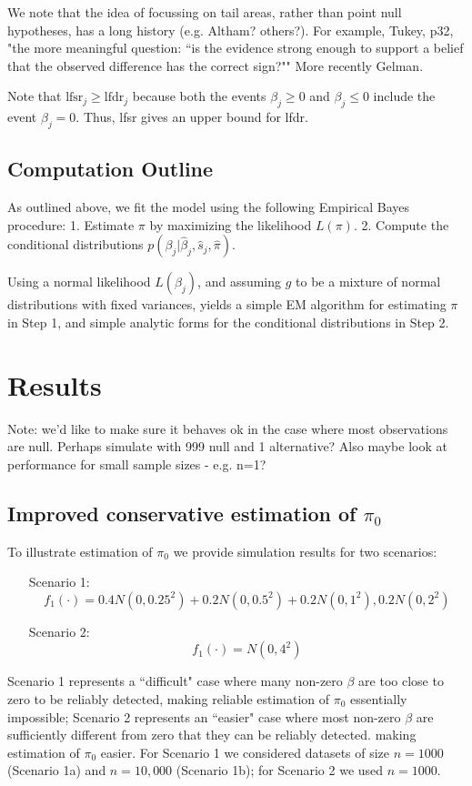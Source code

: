 \documentclass[11pt]{article}
\def\bhat{\hat{\beta}}
\def\shat{\hat{s}}
\begin{document}
We note that the idea of focussing on tail areas, rather than point null hypotheses,
has a long history (e.g. Altham? others?). For example, 
Tukey, p32, "the more meaningful question: ``is the evidence strong enough to support a belief that the observed difference has the correct sign?""
More recently Gelman.


Note that $\text{lfsr}_j \geq \text{lfdr}_j$ 
because both the events $\beta_j \geq 0$
and $\beta_j \leq 0$ include the event $\beta_j=0$.
Thus, lfsr gives an upper bound for lfdr.






\subsection{Computation Outline}

As outlined above, we fit the model using the following Empirical Bayes procedure:
1. Estimate $\pi$ by maximizing the likelihood $L(\pi)$.
2. Compute the conditional distributions $p(\beta_j | \bhat_j, \shat_j, \hat\pi)$.

Using a normal likelihood $L(\beta_j)$, and assuming
$g$ to be a mixture of normal distributions with fixed variances, 
yields a simple EM algorithm
for estimating $\pi$ in Step 1, and simple analytic forms for the conditional
distributions in Step 2.


\section*{Results}

Note: we'd like to make sure it behaves ok in the case where most observations are null.
Perhaps simulate with 999 null and 1 alternative?
Also maybe look at performance for small sample sizes - e.g. n=1?


\subsection*{Improved conservative estimation of $\pi_0$}

To illustrate estimation of $\pi_0$ we provide simulation results for two scenarios:
\begin{enumerate}
\item[Scenario 1:]
\begin{equation}
f_1(\cdot) =  0.4 N(0,0.25^2) + 0.2 N(0,0.5^2) + 0.2 N(0,1^2), 0.2 N(0,2^2)
\end{equation}
\item[Scenario 2:]
\begin{equation}
f_1(\cdot) = N(0,4^2)
\end{equation}
\end{enumerate}
Scenario 1 represents a ``difficult" case where many non-zero $\beta$ are
too close to  zero to be reliably detected, making reliable estimation of $\pi_0$ essentially impossible; 
Scenario 2 represents an ``easier" case where most non-zero $\beta$ are
sufficiently different from zero that they can be reliably detected. making estimation of $\pi_0$ easier.
For Scenario 1 we considered datasets of size $n=1000$ (Scenario 1a) and $n=10,000$ (Scenario 1b);
for Scenario 2 we used $n=1000$.
\end{document}
